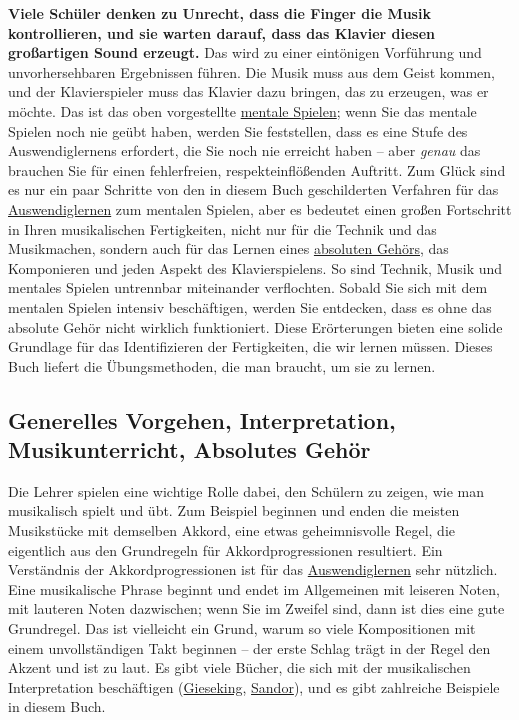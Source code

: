 \textbf{Viele Schüler denken zu Unrecht, dass die Finger die Musik kontrollieren, und sie warten darauf, dass das Klavier diesen großartigen Sound erzeugt.}
Das wird zu einer eintönigen Vorführung und unvorhersehbaren Ergebnissen führen.
Die Musik muss aus dem Geist kommen, und der Klavierspieler muss das Klavier dazu bringen, das zu erzeugen, was er möchte.
Das ist das oben vorgestellte \hyperref[c1ii12mental]{mentale Spielen};
wenn Sie das mentale Spielen noch nie geübt haben, werden Sie feststellen, dass es eine Stufe des Auswendiglernens erfordert, die Sie noch nie erreicht haben -- aber \textit{genau} das brauchen Sie für einen fehlerfreien, respekteinflößenden Auftritt.
Zum Glück sind es nur ein paar Schritte von den in diesem Buch geschilderten Verfahren für das \hyperref[c1iii6]{Auswendiglernen} zum mentalen Spielen, aber es bedeutet einen großen Fortschritt in Ihren musikalischen Fertigkeiten, nicht nur für die Technik und das Musikmachen, sondern auch für das Lernen eines \hyperref[c1iii12]{absoluten Gehörs}, das Komponieren und jeden Aspekt des Klavierspielens.
So sind Technik, Musik und mentales Spielen untrennbar miteinander verflochten.
Sobald Sie sich mit dem mentalen Spielen intensiv beschäftigen, werden Sie entdecken, dass es ohne das absolute Gehör nicht wirklich funktioniert.
Diese Erörterungen bieten eine solide Grundlage für das Identifizieren der Fertigkeiten, die wir lernen müssen.
Dieses Buch liefert die Übungsmethoden, die man braucht, um sie zu lernen.


\subsection{Generelles Vorgehen, Interpretation, Musikunterricht, Absolutes Gehör}
\label{c1i4}

Die Lehrer spielen eine wichtige Rolle dabei, den Schülern zu zeigen, wie man musikalisch spielt und übt.
Zum Beispiel beginnen und enden die meisten Musikstücke mit demselben Akkord, eine etwas geheimnisvolle Regel, die eigentlich aus den Grundregeln für Akkordprogressionen resultiert.
Ein Verständnis der Akkordprogressionen ist für das \hyperref[c1iii6]{Auswendiglernen} sehr nützlich.
Eine musikalische Phrase beginnt und endet im Allgemeinen mit leiseren Noten, mit lauteren Noten dazwischen; wenn Sie im Zweifel sind, dann ist dies eine gute Grundregel.
Das ist vielleicht ein Grund, warum so viele Kompositionen mit einem unvollständigen Takt beginnen -- der erste Schlag trägt in der Regel den Akzent und ist zu laut.
Es gibt viele Bücher, die sich mit der musikalischen Interpretation beschäftigen (\hyperref[Gieseking]{Gieseking}, \hyperref[Sandor]{Sandor}), und es gibt zahlreiche Beispiele in diesem Buch.

